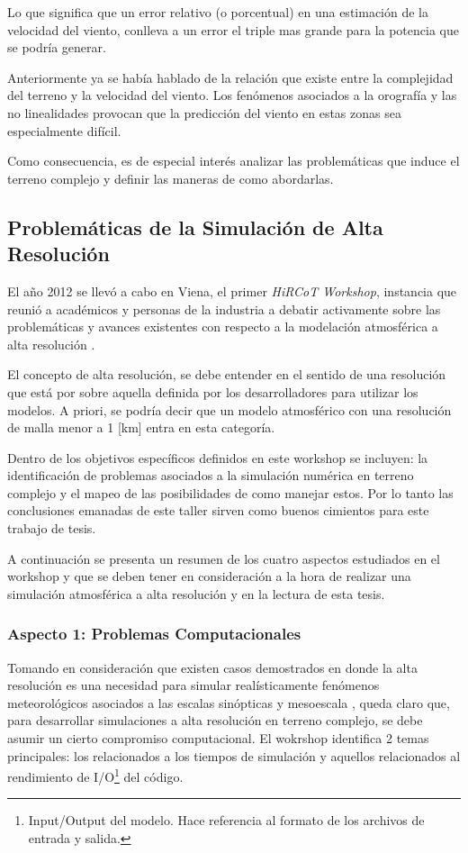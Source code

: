 Lo que significa que un error relativo (o porcentual) en una estimación de la velocidad del viento, conlleva a un error el triple mas grande para la potencia que se podría generar.

Anteriormente ya se había hablado de la relación que existe entre la complejidad del terreno y la velocidad del viento. Los fenómenos asociados a la orografía y las no linealidades provocan que la predicción del viento en estas zonas sea especialmente difícil. 

Como consecuencia, es de especial interés analizar las problemáticas que induce el terreno complejo y definir las maneras de como abordarlas.
\subsection{Problemáticas de la Simulación de Alta Resolución}
El año 2012 se llevó a cabo en Viena, el primer \emph{HiRCoT Workshop}, instancia que reunió a académicos y personas de la industria a debatir activamente sobre las problemáticas y avances existentes con respecto a la modelación atmosférica a alta resolución \citep{Arnold2010}.

El concepto de alta resolución, se debe entender en el sentido de una resolución que está por sobre aquella definida por los desarrolladores para utilizar los modelos. A priori, se podría decir que un modelo atmosférico con una resolución de malla menor a 1 [km] entra en esta categoría.

Dentro de los objetivos específicos definidos en este workshop se incluyen: la identificación de problemas asociados a la simulación numérica en terreno complejo y el mapeo de las posibilidades de como manejar estos. Por lo tanto las conclusiones emanadas de este taller sirven como buenos cimientos para este trabajo de tesis.

A continuación se presenta un resumen de los cuatro aspectos estudiados en el workshop y que se deben tener en consideración a la hora de realizar una simulación atmosférica a alta resolución y en la lectura de esta tesis.

\subsubsection{Aspecto 1: Problemas Computacionales}
Tomando en consideración que existen casos demostrados en donde la alta resolución es una necesidad para simular realísticamente fenómenos meteorológicos asociados a las escalas sinópticas y mesoescala \citep{morton2007tradeoffs,stevens2010using}, queda claro que, para desarrollar simulaciones a alta resolución en terreno complejo, se debe asumir un cierto compromiso computacional. El wokrshop identifica 2 temas principales: los relacionados a los tiempos de simulación y aquellos relacionados al rendimiento de I/O\footnote{Input/Output del modelo. Hace referencia al formato de los archivos de entrada y salida.} del código.

